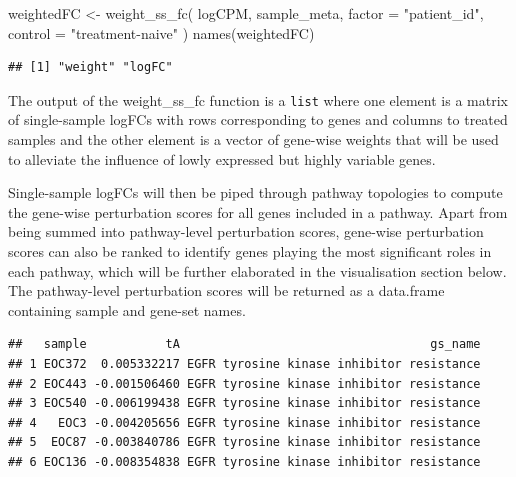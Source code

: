 \documentclass[9pt,a4paper,]{extarticle}
\newenvironment{Shaded}{\begin{snugshade}}{\end{snugshade}}
\newcommand{\AttributeTok}[1]{\textcolor[rgb]{0.77,0.63,0.00}{#1}}
\newcommand{\CommentTok}[1]{\textcolor[rgb]{0.56,0.35,0.01}{\textit{#1}}}
\newcommand{\FunctionTok}[1]{\textcolor[rgb]{0.00,0.00,0.00}{#1}}
\newcommand{\NormalTok}[1]{#1}
\newcommand{\OtherTok}[1]{\textcolor[rgb]{0.56,0.35,0.01}{#1}}
\newcommand{\SpecialCharTok}[1]{\textcolor[rgb]{0.00,0.00,0.00}{#1}}
\newcommand{\StringTok}[1]{\textcolor[rgb]{0.31,0.60,0.02}{#1}}
\begin{document}
\begin{Shaded}
\begin{Highlighting}[]
\NormalTok{weightedFC }\OtherTok{\textless{}{-}} \FunctionTok{weight\_ss\_fc}\NormalTok{(}
\NormalTok{    logCPM, sample\_meta, }\AttributeTok{factor =} \StringTok{"patient\_id"}\NormalTok{, }
    \AttributeTok{control =} \StringTok{"treatment{-}naive"}
\NormalTok{)}
\FunctionTok{names}\NormalTok{(weightedFC)}
\end{Highlighting}
\end{Shaded}

\begin{verbatim}
## [1] "weight" "logFC"
\end{verbatim}

The output of the weight\_ss\_fc function is a \texttt{list} where one element is a matrix of single-sample logFCs with rows corresponding to genes and columns to treated samples and the other element is a vector of gene-wise weights that will be used to alleviate the influence of lowly expressed but highly variable genes.

Single-sample logFCs will then be piped through pathway topologies to compute the gene-wise perturbation scores for all genes included in a pathway. Apart from being summed into pathway-level perturbation scores, gene-wise perturbation scores can also be ranked to identify genes playing the most significant roles in each pathway, which will be further elaborated in the visualisation section below. The pathway-level perturbation scores will be returned as a data.frame containing sample and gene-set names.

\begin{Shaded}
\end{Shaded}

\begin{verbatim}
##   sample           tA                                   gs_name
## 1 EOC372  0.005332217 EGFR tyrosine kinase inhibitor resistance
## 2 EOC443 -0.001506460 EGFR tyrosine kinase inhibitor resistance
## 3 EOC540 -0.006199438 EGFR tyrosine kinase inhibitor resistance
## 4   EOC3 -0.004205656 EGFR tyrosine kinase inhibitor resistance
## 5  EOC87 -0.003840786 EGFR tyrosine kinase inhibitor resistance
## 6 EOC136 -0.008354838 EGFR tyrosine kinase inhibitor resistance
\end{verbatim}
\end{document}

